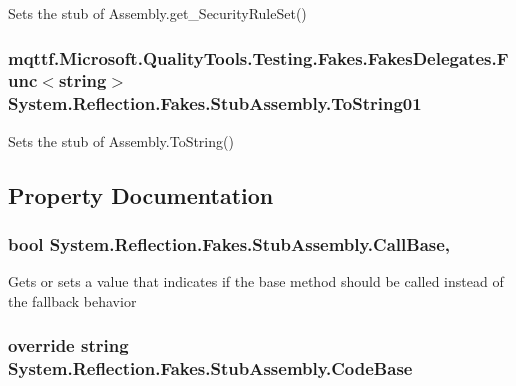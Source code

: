 Sets the stub of Assembly.\-get\-\_\-\-Security\-Rule\-Set()

\hypertarget{class_system_1_1_reflection_1_1_fakes_1_1_stub_assembly_a039c6c36a8b23cad2e4f55b607a17267}{
\subsubsection[{To\-String01}]{\setlength{\rightskip}{0pt plus 5cm}mqttf.\-Microsoft.\-Quality\-Tools.\-Testing.\-Fakes.\-Fakes\-Delegates.\-Func$<$string$>$ System.\-Reflection.\-Fakes.\-Stub\-Assembly.\-To\-String01}}\label{class_system_1_1_reflection_1_1_fakes_1_1_stub_assembly_a039c6c36a8b23cad2e4f55b607a17267}


Sets the stub of Assembly.\-To\-String()



\subsection{Property Documentation}
\hypertarget{class_system_1_1_reflection_1_1_fakes_1_1_stub_assembly_a3ea4d528fb98d2cfd1396c37aeea2250}{
\subsubsection[{Call\-Base}]{\setlength{\rightskip}{0pt plus 5cm}bool System.\-Reflection.\-Fakes.\-Stub\-Assembly.\-Call\-Base\hspace{0.3cm}{\ttfamily [get]}, {\ttfamily [set]}}}\label{class_system_1_1_reflection_1_1_fakes_1_1_stub_assembly_a3ea4d528fb98d2cfd1396c37aeea2250}


Gets or sets a value that indicates if the base method should be called instead of the fallback behavior

\hypertarget{class_system_1_1_reflection_1_1_fakes_1_1_stub_assembly_ae060674d09f2c0158723564eb775c783}{
\subsubsection[{Code\-Base}]{\setlength{\rightskip}{0pt plus 5cm}override string System.\-Reflection.\-Fakes.\-Stub\-Assembly.\-Code\-Base\hspace{0.3cm}{\ttfamily [get]}}}\label{class_system_1_1_reflection_1_1_fakes_1_1_stub_assembly_ae060674d09f2c0158723564eb775c783}


